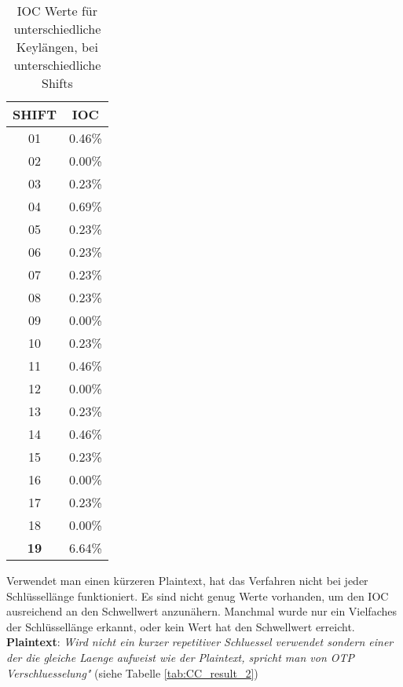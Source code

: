 \begin{table}[h]
\begin{subtable}[h]{0.3\textwidth}
\begin{tabular}{c|c}
            SHIFT & IOC\\\hline
            01&      0.46\%\\
            02&      0.00\%\\
            03&      0.23\%\\
            04&      0.69\%\\
            05&      0.23\%\\
            06&      0.23\%\\
            07&      0.23\%\\
            08&      0.23\%\\
            09&      0.00\%\\
            10&      0.23\%\\
            11&      0.46\%\\
            12&      0.00\%\\
            13&      0.23\%\\
            14&      0.46\%\\
            15&      0.23\%\\
            16&      0.00\%\\
            17&      0.23\%\\
            18&      0.00\%\\
            \textbf{19}&      6.64\%
        \end{tabular}
    \end{subtable}
    \caption{IOC Werte für unterschiedliche Keylängen, bei unterschiedliche Shifts}
    \label{tab:CC_result_1}
\end{table}\newline
Verwendet man einen kürzeren Plaintext, hat das Verfahren nicht bei jeder Schlüssellänge funktioniert.
Es sind nicht genug Werte vorhanden, um den IOC ausreichend an den Schwellwert anzunähern. Manchmal wurde
nur ein Vielfaches der Schlüssellänge erkannt, oder kein Wert hat den Schwellwert erreicht.\vspace*{1em}\newline
\textbf{Plaintext}: \textit{Wird nicht ein kurzer repetitiver Schluessel verwendet sondern einer der
die gleiche Laenge aufweist wie der Plaintext, spricht man von OTP
Verschluesselung"} (siehe Tabelle \ref{tab:CC_result_2})
